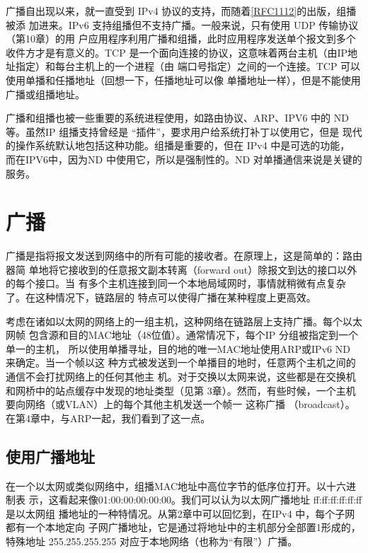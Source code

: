 广播自出现以来，就一直受到 IPv4 协议的支持，而随着\href{https://www.rfc-editor.org/rfc/rfc1112}{[RFC1112]}的出版，组播被添
加进来。IPv6 支持组播但不支持广播。一般来说，只有使用 UDP 传输协议（第10章）的用
户应用程序利用广播和组播，此时应用程序发送单个报文到多个收件方才是有意义的。TCP
是一个面向连接的协议，这意味着两台主机（由IP地址指定）和每台主机上的一个进程（由
端口号指定）之间的一个连接。TCP 可以使用单播和任播地址（回想一下，任播地址可以像
单播地址一样），但是不能使用广播或组播地址。


\begin{tcolorbox}
    广播和组播也被一些重要的系统进程使用，如路由协议、ARP、IPV6 中的
ND 等。虽然IP 组播支持曾经是 “插件”，要求用户给系统打补丁以使用它，但是
现代的操作系统默认地包括这种功能。组播是重要的，但在 IPv4 中是可选的功能，
而在IPV6中，因为ND 中使用它，所以是强制性的。ND 对单播通信来说是关键的
服务。
\end{tcolorbox}

\section{广播}
广播是指将报文发送到网络中的所有可能的接收者。在原理上，这是简单的：路由器简
单地将它接收到的任意报文副本转离（forward out）除报文到达的接口以外的每个接口。当
有多个主机连接到同一个本地局域网时，事情就稍微有点复杂了。在这种情况下，链路层的
特点可以使得广播在某种程度上更高效。

考虑在诸如以太网的网络上的一组主机，这种网络在链路层上支持广播。每个以太网帧
包含源和目的MAC地址（48位值）。通常情况下，每个IP 分组被指定到一个单一的主机，
所以使用单播寻址，目的地的唯一MAC地址使用ARP或IPv6 ND 来确定。当一个帧以这
种方式被发送到一个单播目的地时，任意两个主机之间的通信不会打扰网络上的任何其他主
机。对于交换以太网来说，这些都是在交换机和网桥中的站点缓存中发现的地址类型（见第
3章）。然而，有些时候，一个主机要向网络（或VLAN）上的每个其他主机发送一个帧一
这称广播 （broadcast）。在第4章中，与ARP一起，我们看到了这一点。

\subsection{使用广播地址}
在一个以太网或类似网络中，组播MAC地址中高位字节的低序位打开。以十六进制表
示，这看起来像01:00:00:00:00:00。我们可以认为以太网广播地址 ff:ff:ff:ff:ff:ff 是以太网组
播地址的一种特情况。从第2章中可以回忆到，在IPv4 中，每个子网都有一个本地定向
子网广播地址，它是通过将地址中的主机部分全部置1形成的，特殊地址 255.255.255.255
对应于本地网络（也称为“有限”）广播。

